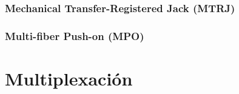 \subsubsection*{Mechanical Transfer-Registered Jack (MTRJ)}
\subsubsection*{Multi-fiber Push-on (MPO)}
\section{Multiplexación}

